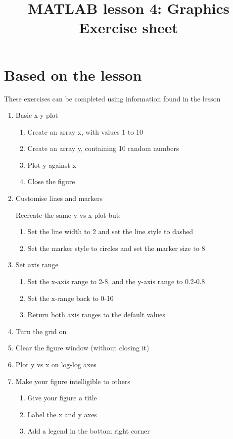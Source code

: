 \documentclass[a4paper]{article}
\title{MATLAB lesson 4: Graphics\\Exercise sheet}
\date{}
\begin{document}
\maketitle

\section{Based on the lesson}
{\large These exercises can be completed using information found in the lesson}

\begin{enumerate}
	\item Basic x-y plot
	\begin{enumerate}
		\item Create an array x, with values 1 to 10
		\item Create an array y, containing 10 random numbers
		\item Plot y against x
		\item Close the figure	
	\end{enumerate}
	
	\item Customise lines and markers
	
	Recreate the same y vs x plot but:
	\begin{enumerate}
		
		\item Set the line width to 2 and set the line style to dashed
		\item Set the marker style to circles and set the marker size to 8
	\end{enumerate}

	\item Set axis range
	\begin{enumerate}
	
		\item Set the x-axis range to 2-8, and the y-axis range to 0.2-0.8	
		\item Set the x-range back to 0-10
		\item Return both axis ranges to the default values
	\end{enumerate}
	
	\item Turn the grid on
	\item Clear the figure window (without closing it)
	\item Plot y vs x on log-log axes
	
	\item Make your figure intelligible to others
	\begin{enumerate}
		\item Give your figure a title
		\item Label the x and y axes
		\item Add a legend in the bottom right corner
	\end{enumerate}
	

\end{enumerate}
\end{document}
